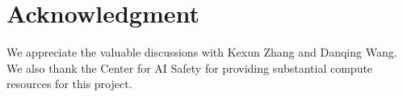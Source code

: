 

\section*{Acknowledgment}  

We appreciate the valuable discussions with Kexun Zhang and Danqing Wang. We also thank the Center for AI Safety for providing substantial compute resources for this project.